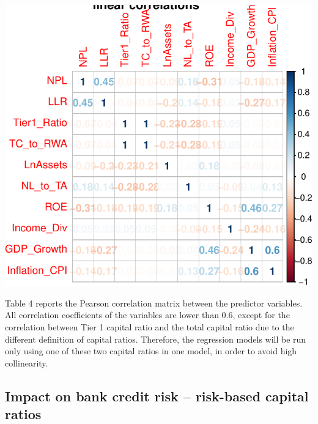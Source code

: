 \documentclass{article}
\begin{document}
\begin{center}\includegraphics{preprint_files/figure-latex/correlation-1} \end{center}

Table 4 reports the Pearson correlation matrix between the predictor
variables. All correlation coefficients of the variables are lower than
0.6, except for the correlation between Tier 1 capital ratio and the
total capital ratio due to the different definition of capital ratios.
Therefore, the regression models will be run only using one of these two
capital ratios in one model, in order to avoid high collinearity.

\hypertarget{impact-on-bank-credit-risk-risk-based-capital-ratios}{%
\subsection{Impact on bank credit risk -- risk-based capital
ratios}\label{impact-on-bank-credit-risk-risk-based-capital-ratios}}

\begingroup\fontsize{7}{9}\selectfont
\end{document}
